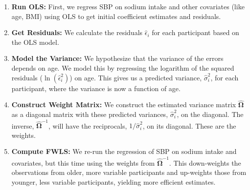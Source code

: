 \documentclass{article}
\begin{document}
\begin{enumerate}
    \item \textbf{Run OLS:} First, we regress SBP on sodium intake and other covariates (like age, BMI) using OLS to get initial coefficient estimates and residuals. 
    
    \item \textbf{Get Residuals:} We calculate the residuals $\hat{\epsilon}_i$ for each participant based on the OLS model.
    
    \item \textbf{Model the Variance:} We hypothesize that the variance of the errors depends on age. We model this by regressing the logarithm of the squared residuals ($\ln(\hat{\epsilon}_i^2)$) on age. This gives us a predicted variance, $\hat{\sigma}_i^2$, for each participant, where the variance is now a function of age.
    
    \item \textbf{Construct Weight Matrix:} We construct the estimated variance matrix $\hat{\boldsymbol{\Omega}}$ as a diagonal matrix with these predicted variances, $\hat{\sigma}_i^2$, on the diagonal. The inverse, $\hat{\boldsymbol{\Omega}}^{-1}$, will have the reciprocals, $1/\hat{\sigma}_i^2$, on its diagonal. These are the weights.
    
    \item \textbf{Compute FWLS:} We re-run the regression of SBP on sodium intake and covariates, but this time using the weights from $\hat{\boldsymbol{\Omega}}^{-1}$. This down-weights the observations from older, more variable participants and up-weights those from younger, less variable participants, yielding more efficient estimates.
\end{enumerate}
\end{document}
